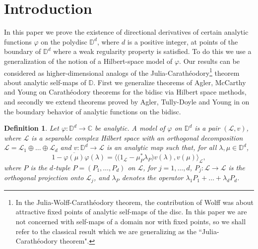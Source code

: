 \documentclass[11pt, reqno]{amsart}
\newtheorem{definition}[theorem]{Definition}
\newcommand\1{\boldsymbol {1}}
\newcommand{\D}{\mathbb{D}}
\newcommand{\ph}{\varphi}
\numberwithin{equation}{section}
\begin{document}
\maketitle
\tableofcontents
\section{Introduction}\label{intro}
In this paper we prove the existence of directional derivatives of certain analytic functions $\ph$ on the polydisc $\D^d$, where $d$ is a positive integer, at points of the boundary of $\D^d$ where a weak regularity property is satisfied. To do this we use a generalization of the notion of a Hilbert-space model of $\ph$.
Our results can be considered as higher-dimensional analogs of the  Julia-Carath\'{e}odory\footnote{In the Julia-Wolff-Carath\'eodory theorem, the contribution of Wolff was about attractive fixed points of analytic self-maps of the disc.  In this paper we are not concerned with self-maps of a domain nor with fixed points, so we shall refer to the classical result which we are generalizing as the ``Julia-Carath\'eodory theorem".}  theorem about analytic self-maps of $\D$. First we generalize theorems of Agler, McCarthy and Young \cite{AMYcara} on Carath\'eodory theorems for the bidisc via Hilbert space methods, and secondly we extend theorems proved by Agler, Tully-Doyle and Young in \cite{ATY2} on the boundary behavior of analytic functions on the bidisc.
\begin{definition}{}\label{modelpolydefinto}
Let $\varphi:\mathbb{D}^{d}\rightarrow\mathbb{C}$ be analytic. A {\em{model}} of $\varphi$ on $\mathbb{D}^{d}$ is a pair $(\mathcal{L},v)$, where $\mathcal{L}$ is a separable complex Hilbert space with an orthogonal decomposition $\mathcal{L}=\mathcal{L}_{1}\oplus\hdots\oplus\mathcal{L}_{d}$ and $v : \mathbb{D}^{d} \rightarrow \mathcal{L}$ is an analytic map such that, for all $\lambda, \mu \in \mathbb{D}^{d}$,
\begin{equation}\label{modeleqn}
1-\overline{\varphi(\mu)}\varphi(\lambda) = \Big\langle{\big(1_{\mathcal{L}}-\mu_{P}^{*}\lambda_{P}\big)v({\lambda}),v({\mu})} \Big\rangle_{\mathcal{L}},
\end{equation}
where $P$ is the $d$-tuple $P=(P_{1},\hdots,P_{d})$ on $\mathcal{L}$, for $j=1,\hdots,d$, $P_{j}:\mathcal{L}\rightarrow\mathcal{L}$ is the orthogonal projection onto $\mathcal{L}_{j}$,  and $\lambda_{P}$ denotes the operator $\lambda_{1}P_{1}+\hdots+\lambda_{d}P_{d}$.
\end{definition} 
\end{document}
